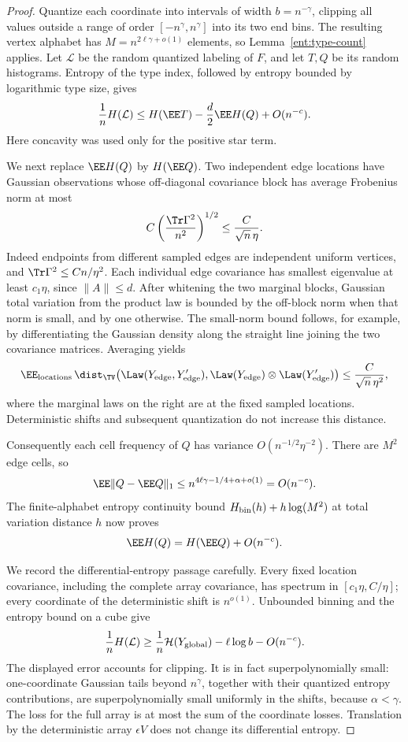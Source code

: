 \begin{proof}
Quantize each coordinate into intervals of width \(b=n^{-\gamma}\),
clipping all values outside a range of order
\([-n^\gamma,n^\gamma]\) into its two end bins. The resulting vertex
alphabet has \(M=n^{2\ell\gamma+o(1)}\) elements, so
Lemma~\ref{ent:type-count} applies. Let \(\mathcal L\) be the random
quantized labeling of \(F\), and let \(T,Q\) be its random histograms.
Entropy of the type index, followed by entropy bounded by logarithmic
type size, gives
\begin{equation}\label{eq:ent-quantized}
 \frac1nH(\mathcal L)
 \le H(\EE T)-\frac d2\EE H(Q)+O(n^{-c}).
\end{equation}
Here concavity was used only for the positive star term.

We next replace \(\EE H(Q)\) by \(H(\EE Q)\). Two independent edge
locations have Gaussian observations whose off-diagonal covariance
block has average Frobenius norm at most
\[
 C\left(\frac{\Tr\Gamma^2}{n^2}\right)^{1/2}
 \le \frac{C}{\sqrt n\,\eta}.
\]
Indeed endpoints from different sampled edges are independent uniform
vertices, and \(\Tr\Gamma^2\le Cn/\eta^2\).
Each individual edge covariance has smallest eigenvalue at least
\(c_1\eta\), since \(\|A\|\le d\).
After whitening the two marginal blocks, Gaussian total variation
from the product law is bounded by the off-block norm when that norm
is small, and by one otherwise. The small-norm bound follows, for
example, by differentiating the Gaussian density along the straight
line joining the two covariance matrices. Averaging yields
\[
 \EE_{\rm locations}\,
 \dist_{\TV}\bigl(\Law(Y_{\rm edge},Y_{\rm edge}'),
                 \Law(Y_{\rm edge})\otimes
                 \Law(Y_{\rm edge}')\bigr)
 \le \frac{C}{\sqrt n\,\eta^2},
\]
where the marginal laws on the right are at the fixed sampled
locations. Deterministic shifts and subsequent quantization do not
increase this distance.

Consequently each cell frequency of \(Q\) has variance
\(O(n^{-1/2}\eta^{-2})\). There are \(M^2\) edge cells, so
\[
 \EE\|Q-\EE Q\|_1
 \le n^{4\ell\gamma-1/4+\alpha+o(1)}=O(n^{-c}).
\]
The finite-alphabet entropy continuity bound
\(H_{\rm bin}(h)+h\log(M^2)\) at total variation distance \(h\)
now proves
\begin{equation}\label{eq:ent-edge-concentration}
 \EE H(Q)=H(\EE Q)+O(n^{-c}).
\end{equation}

We record the differential-entropy passage carefully. Every fixed
location covariance, including the complete array covariance, has
spectrum in \([c_1\eta,C/\eta]\); every coordinate of the deterministic
shift is \(n^{o(1)}\). Unbounded binning and the entropy bound on a cube give
\[
 \frac1nH(\mathcal L)
 \ge \frac1n\mathcal H(Y_{\rm global})
           -\ell\log b-O(n^{-c}).
\]
The displayed error accounts for clipping. It is in fact
superpolynomially small: one-coordinate Gaussian tails beyond
\(n^\gamma\), together with their quantized entropy contributions,
are superpolynomially small uniformly in the shifts, because
\(\alpha<\gamma\). The loss for the full array is at most the sum
of the coordinate losses. Translation by the deterministic array
\(\epsilon V\) does not change its differential entropy.


\end{proof}
